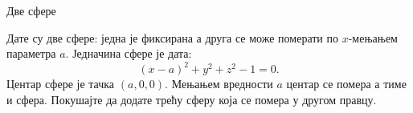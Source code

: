 \documentclass[sr]{./../../common/SurferDesc}%
\begin{document}
\footnotesize
%
\begin{surferPage}
  \begin{surferTitle} Две сфере\end{surferTitle}
   \begin{surferText}   
   
Дате су две сфере: једна је фиксирана а друга се може померати по $x$-мењањем параметра $a$.
Једначина сфере је дата:
\[(x-a)^2+y^2+z^2-1=0.\]
Центар сфере је тачка $(a,0,0)$. Мењањем вредности $a$ центар се помера а тиме и сфера.
Покушајте да додате трећу сферу која се помера у другом правцу.
     \end{surferText}
\end{surferPage}
\end{document}

